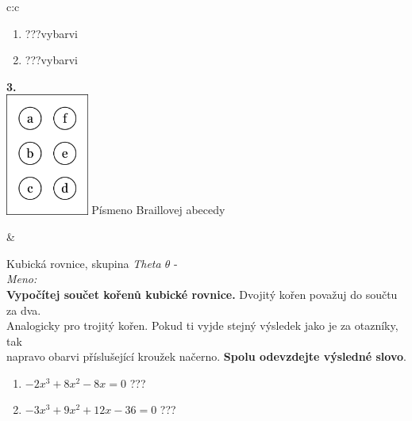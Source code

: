 \documentclass[10pt]{report}
\begin{document}
\begin{tabular}{c:c}
\begin{minipage}[c][99mm][t]{0.49\linewidth}
\begin{center}
\begin{minipage}{0.77\linewidth}
\begin{center}
\begin{varwidth}{\textwidth}
\begin{enumerate}
\item \quad \dotfill\; ???\;\dotfill \quad vybarvi
\item \quad \dotfill\; ???\;\dotfill \quad vybarvi
\end{enumerate}
\end{varwidth}
\end{center}
\end{minipage}
\begin{minipage}{0.20\linewidth}
\begin{center}
{\Huge\bfseries 3.} \\[2mm]
\includegraphics[height=40mm]{../images/braille.png}
{\small Písmeno Braillovej abecedy}
\end{center}
\end{minipage}
\end{center}
\end{minipage}
&
\begin{minipage}[c][99mm][t]{0.49\linewidth}
\begin{center}
\vspace{7mm}
{\huge Kubická rovnice, skupina \textit{Theta $\theta$} -}\\[4.5mm]
\textit{Meno:}\phantom{xxxxxxxxxxxxxxxxxxxxxxxxxxxxxxxxxxxxxxxxxxxxxxxxxxxxxxxxxxxxxxxxx}\\[3.5mm]
\textbf{Vypočítej součet kořenů kubické rovnice.} Dvojitý kořen považuj do součtu za dva.\\Analogicky pro trojitý kořen. Pokud ti vyjde stejný výsledek jako je za otazníky, tak\\napravo obarvi příslušející kroužek načerno. \textbf{Spolu odevzdejte výsledné slovo}.\\[3mm]
\begin{minipage}{0.77\linewidth}
\begin{center}
\begin{varwidth}{\textwidth}
\begin{enumerate}
\large
\item $-2x^3+8x^2-8x=0$\quad \dotfill\; ???\;\dotfill {}
\item $-3x^3+9x^2+12x-36=0$\quad \dotfill\; ???\;\dotfill {}

\end{enumerate}
\end{varwidth}
\end{center}
\end{minipage}
\end{center}
\end{minipage}
\end{tabular}
\end{document}
